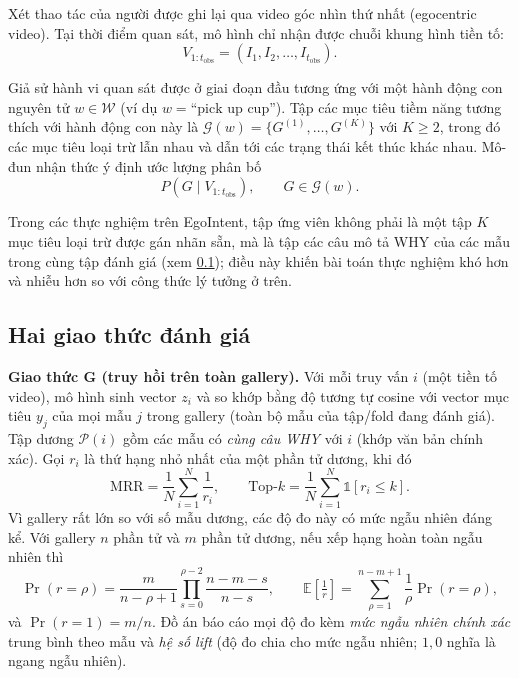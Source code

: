 \documentclass[12pt,a4paper]{report}
\begin{document}
Xét thao tác của người được ghi lại qua video góc nhìn thứ nhất (egocentric video). Tại thời điểm quan sát, mô hình chỉ nhận được chuỗi khung hình tiền tố:
\begin{equation}
    V_{1:t_{\mathrm{obs}}} = \left(I_1, I_2, \dots, I_{t_{\mathrm{obs}}}\right).
\end{equation}

Giả sử hành vi quan sát được ở giai đoạn đầu tương ứng với một hành động con nguyên tử $w \in \mathcal{W}$ (ví dụ $w = \text{``pick up cup''}$). Tập các mục tiêu tiềm năng tương thích với hành động con này là $\mathcal{G}(w) = \{G^{(1)}, \dots, G^{(K)}\}$ với $K \ge 2$, trong đó các mục tiêu loại trừ lẫn nhau và dẫn tới các trạng thái kết thúc khác nhau. Mô-đun nhận thức ý định ước lượng phân bố
\begin{equation}
    \label{eq:goal_disambiguation_formulation}
    \hat{P}\left(G \mid V_{1:t_{\mathrm{obs}}}\right), \qquad G \in \mathcal{G}(w).
\end{equation}

Trong các thực nghiệm trên EgoIntent, tập ứng viên không phải là một tập $K$ mục tiêu loại trừ được gán nhãn sẵn, mà là tập các câu mô tả WHY của các mẫu trong cùng tập đánh giá (xem \cref{sec:protocols}); điều này khiến bài toán thực nghiệm khó hơn và nhiễu hơn so với công thức lý tưởng ở trên.

\subsection{Hai giao thức đánh giá}
\label{sec:protocols}

\textbf{Giao thức G (truy hồi trên toàn gallery).} Với mỗi truy vấn $i$ (một tiền tố video), mô hình sinh vector $z_i$ và so khớp bằng độ tương tự cosine với vector mục tiêu $y_j$ của mọi mẫu $j$ trong gallery (toàn bộ mẫu của tập/fold đang đánh giá). Tập dương $\mathcal{P}(i)$ gồm các mẫu có \emph{cùng câu WHY} với $i$ (khớp văn bản chính xác). Gọi $r_i$ là thứ hạng nhỏ nhất của một phần tử dương, khi đó
\begin{equation}
    \mathrm{MRR} = \frac{1}{N}\sum_{i=1}^{N}\frac{1}{r_i}, \qquad \mathrm{Top}\text{-}k = \frac{1}{N}\sum_{i=1}^{N}\mathbb{1}[r_i \le k].
\end{equation}
Vì gallery rất lớn so với số mẫu dương, các độ đo này có mức ngẫu nhiên đáng kể. Với gallery $n$ phần tử và $m$ phần tử dương, nếu xếp hạng hoàn toàn ngẫu nhiên thì
\begin{equation}
    \label{eq:chance}
    \Pr(r=\rho) = \frac{m}{n-\rho+1}\prod_{s=0}^{\rho-2}\frac{n-m-s}{n-s}, \qquad
    \mathbb{E}\!\left[\tfrac{1}{r}\right]=\sum_{\rho=1}^{n-m+1}\frac{1}{\rho}\Pr(r=\rho),
\end{equation}
và $\Pr(r=1)=m/n$. Đồ án báo cáo mọi độ đo kèm \emph{mức ngẫu nhiên chính xác} trung bình theo mẫu và \emph{hệ số lift} (độ đo chia cho mức ngẫu nhiên; $1{,}0$ nghĩa là ngang ngẫu nhiên).
\end{document}
